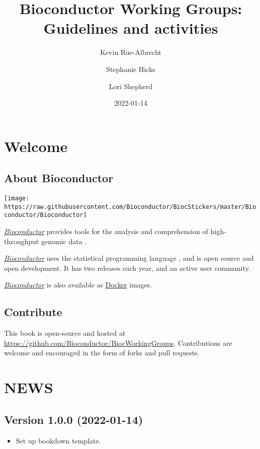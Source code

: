 \documentclass[
]{book}
\title{Bioconductor Working Groups: Guidelines and activities}
\author{Kevin Rue-Albrecht \and Stephanie Hicks \and Lori Shepherd}
\date{2022-01-14}
\providecommand{\tightlist}{%
  \setlength{\itemsep}{0pt}\setlength{\parskip}{0pt}}
\begin{document}
\maketitle

{
\setcounter{tocdepth}{1}
\tableofcontents
}
\hypertarget{welcome}{%
\chapter*{Welcome}\label{welcome}}

\hypertarget{about-bioconductor}{%
\section*{About Bioconductor}\label{about-bioconductor}}

\begin{center}\texttt{[image: https://raw.githubusercontent.com/Bioconductor/BiocStickers/master/Bioconductor/Bioconductor]} \end{center}

\href{https://bioconductor.org/}{\emph{Bioconductor}} provides tools for the analysis and comprehension of high-throughput genomic data \citep{huber2015orchestrating}.

\href{https://bioconductor.org/}{\emph{Bioconductor}} uses the statistical programming language \citep{r2022}, and is open source and open development. It has two releases each year, and an active user community.

\href{https://bioconductor.org/}{\emph{Bioconductor}} is also available as \href{https://bioconductor.org/help/docker/}{Docker} images.

\hypertarget{contribute}{%
\section*{Contribute}\label{contribute}}

This book is open-source and hosted at \url{https://github.com/Bioconductor/BiocWorkingGroups}.
Contributions are welcome and encouraged in the form of forks and pull requests.

\hypertarget{appendix-appendix}{%
\appendix}


\hypertarget{booknews}{%
\chapter{NEWS}\label{booknews}}

\hypertarget{version-1.0.0-2022-01-14}{%
\section{Version 1.0.0 (2022-01-14)}\label{version-1.0.0-2022-01-14}}

\begin{itemize}
\tightlist
\item
  Set up bookdown template.
\end{itemize}

  
\end{document}
